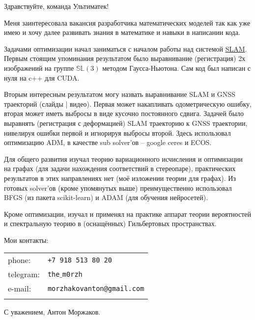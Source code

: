\documentclass[9pt]{article}
\begin{document}
    Здравствуйте, команда Ультиматек!

    Меня заинтересовала вакансия разработчика математических моделей
    так как уже имею и хочу далее развивать знания в математике и навыки в написании кода.

    Задачами оптимизации начал заниматься с началом работы над системой
    \href{https://en.wikipedia.org/wiki/Simultaneous_localization_and_mapping}{SLAM}.
    Первым стоящим упоминания результатом было выравнивание
    (регистрация) 2х изображений на группе $\mathbb{SL}(3)$ методом Гаусса-Ньютона.
    Сам код был написан с нуля на c++ для CUDA.

    Вторым интересным результатом могу назвать выравнивание SLAM и GNSS траекторий (слайды | видео).
    Первая может накапливать одометрическую ошибку, вторая может иметь выбросы в виде кусочно постоянного сдвига.
    Задачей было выравнять (регистрация с деформацией) SLAM траекторию к GNSS траектории,
    нивелируя ошибки первой и игнорируя выбросы второй.
    Здесь использовал оптимизацию ADM, в качестве sub solver'ов -- google ceres и ECOS.

    Для общего развития изучал теорию вариационного исчисления и оптимизации на графах (для задачи нахождения соответствий в
    стереопаре), практических результатов в этих направлениях нет (моё изложении теории для графах).
    Из готовых solver'ов (кроме упомянутых выше) преимущественно использовал BFGS (из пакета scikit-learn) и ADAM (для обучения нейросетей).

    Кроме оптимизации, изучал и применял на практике аппарат теории вероятностей и спектральную теорию в
    (оснащённых) Гильбертовых пространствах.
    

    Мои контакты: \\

    \begin{tabular}{ll}
            phone: & {\tt +7 918 513 80 20} \\
            telegram: & {\tt the$\_$m0rzh} \\
            e-mail:& {\tt morzhakovanton@gmail.com} \\\label{tab:table}
    \end{tabular}


    С уважением,
    Антон Моржаков.
\end{document}

